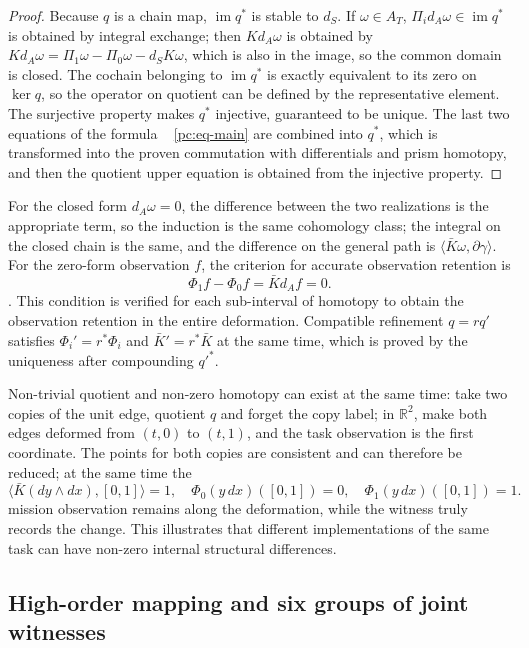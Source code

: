 \documentclass[11pt,a4paper]{article}
\theoremstyle{plain}
\theoremstyle{definition}
\theoremstyle{remark}
\begin{document}
\begin{CJK*}
\begin{proof}
Because $q$ is a chain map, $\operatorname{im}q^*$ is stable to $d_S$. If $\omega\in A_T$, $\Pi_i d_A\omega\in\operatorname{im}q^*$ is obtained by integral exchange; then $Kd_A\omega$ is obtained by $Kd_A\omega=\Pi_1\omega-\Pi_0\omega-d_SK\omega$, which is also in the image, so the common domain is closed. The cochain belonging to $\operatorname{im}q^*$ is exactly equivalent to its zero on $\ker q$, so the operator on quotient can be defined by the representative element. The surjective property makes $q^*$ injective, guaranteed to be unique. The last two equations of the formula ~ \eqref{pc:eq-main} are combined into $q^*$, which is transformed into the proven commutation with differentials and prism homotopy, and then the quotient upper equation is obtained from the injective property.\end{proof}


For the closed form $d_A\omega=0$, the difference between the two realizations is the appropriate term, so the induction is the same cohomology class; the integral on the closed chain is the same, and the difference on the general path is $\langle\bar K\omega,\partial\gamma\rangle$. For the zero-form observation $f$, the criterion for accurate observation retention is \[
 \Phi_1f-\Phi_0f=\bar Kd_Af=0.
\]. This condition is verified for each sub-interval of homotopy to obtain the observation retention in the entire deformation. Compatible refinement $q=rq'$ satisfies $\Phi_i'=r^*\Phi_i$ and $\bar K'=r^*\bar K$ at the same time, which is proved by the uniqueness after compounding $q'^*$.

Non-trivial quotient and non-zero homotopy can exist at the same time: take two copies of the unit edge, quotient $q$ and forget the copy label; in $\mathbb R^2$, make both edges deformed from $(t,0)$ to $(t,1)$, and the task observation is the first coordinate. The points for both copies are consistent and can therefore be reduced; at the same time the \[
 \langle\bar K(dy\wedge dx),[0,1]\rangle=1,
 \quad \Phi_0(y\,dx)([0,1])=0,
 \quad \Phi_1(y\,dx)([0,1])=1.
\] mission observation remains along the deformation, while the witness truly records the change. This illustrates that different implementations of the same task can have non-zero internal structural differences.

\subsection { High-order mapping and six groups of joint witnesses }


\end{CJK*}
\end{document}
